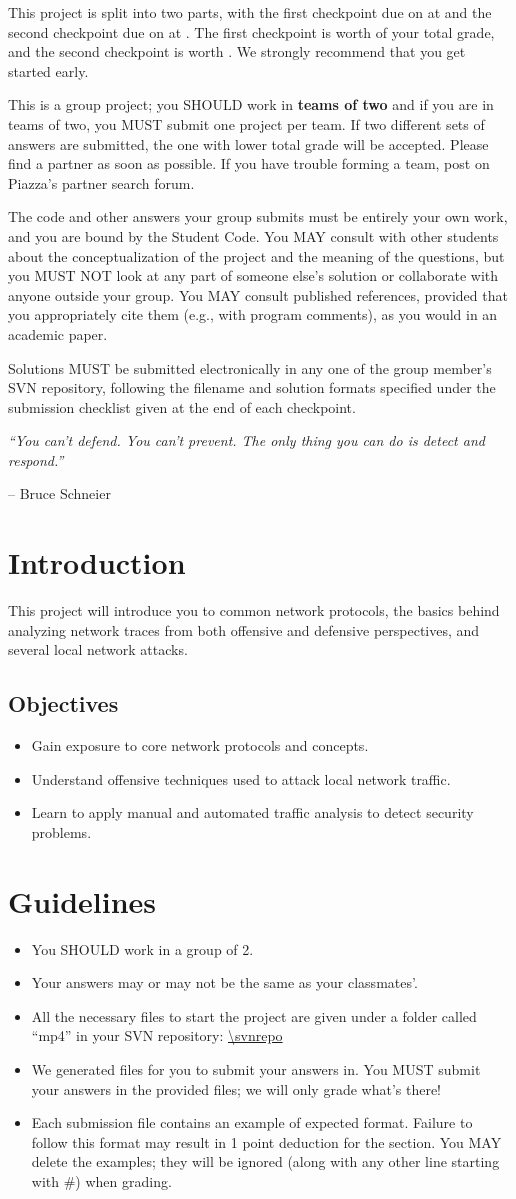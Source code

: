 \documentclass[letterpaper,12pt]{report}
\newcommand{\htitle}
{
     \noindent\parbox{\textwidth}
    {
        \course\hfill \distdate\newline
        \coursename\hfill 
        \settitle \vspace*{-.5ex}\newline
        \mbox{}\hrulefill\mbox{}
    }
    \vspace{8pt}
    \begin{center}{\Large\bf{\settitle}}\end{center}
}
\newcommand{\handout}
{
    \thispagestyle{empty}
    \markboth{}{}
    \pagestyle{plain}
    \htitle
}
\newcommand{\problemsetheader}
{
\setlength{\parindent}{0pt}

\medskip

This project is split into two parts, with the first checkpoint due on {\bf \checkpointduedate} at {\bf \duetime} and the second checkpoint due on {\bf \duedate} at {\bf \duetime}.
The first checkpoint is worth {\firstcheckpointpercent} of your total grade, and the second checkpoint is worth \secondcheckpointpercent.
We strongly recommend that you get started early.

\medskip

This is a group project; you SHOULD work in \textbf{teams of two} and if you are in teams of two, you MUST submit one project per team.
If two different sets of answers are submitted, the one with lower total grade will be accepted.
Please find a partner as soon as possible.
If you have trouble forming a team, post on Piazza's partner search forum.

\medskip

The code and other answers your group submits must be entirely your own work, and you are bound by the Student Code.
You MAY consult with other students about the conceptualization of the project and the meaning of the questions, but you MUST NOT look at any part of someone else's solution or collaborate with anyone outside your group.
You MAY consult published references, provided that you appropriately cite them (e.g., with program comments), as you would in an academic paper.

\medskip

Solutions MUST be submitted electronically in any one of the group member's SVN repository, following the filename and solution formats specified under the submission checklist given at the end of each checkpoint.

\medskip

\hrulefill

\medskip
}
\begin{document}
\handout
\problemsetheader
\medskip
\noindent
\emph{``You can't defend. You can't prevent. The only thing you can do is detect and respond.''}

\begingroup\raggedleft
-- Bruce Schneier\\
\endgroup

\newpage

\section*{Introduction}

This project will introduce you to common network protocols, the basics behind analyzing network traces from both offensive and defensive perspectives, and several local network attacks.

\vspace{-6pt}
\subsection*{Objectives}
\begin{itemize}
\item Gain exposure to core network protocols and concepts.
\item Understand offensive techniques used to attack local network traffic.
\item Learn to apply manual and automated traffic analysis to detect security problems.
\end{itemize}

\section*{Guidelines}
\begin{itemize}
\item You SHOULD work in a group of 2.
\item Your answers may or may not be the same as your classmates'.
\item All the necessary files to start the project are given under a folder called ``mp4'' in your SVN repository: \url{\svnrepo}
\item We generated files for you to submit your answers in.
You MUST submit your answers in the provided files; we will only grade what's there!
\item Each submission file contains an example of expected format. Failure to follow this format may result in 1 point deduction for the section. You MAY delete the examples; they will be ignored (along with any other line starting with \#) when grading.
\end{itemize}
\end{document}

